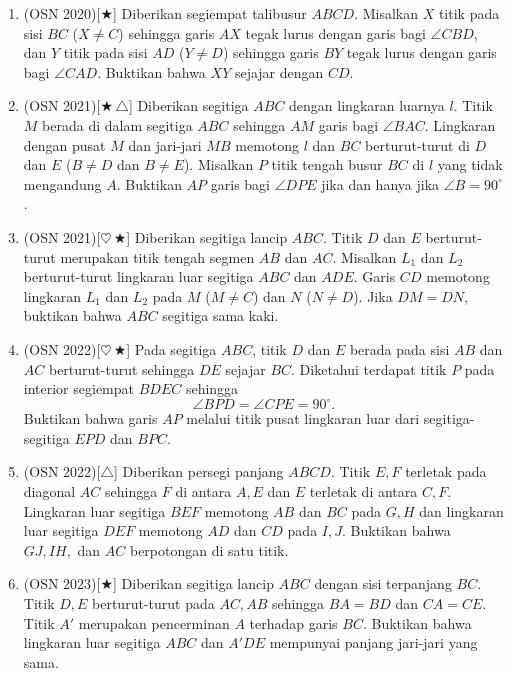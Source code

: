 \documentclass[letterpaper, 13pt]{scrartcl}
\begin{document}
\begin{enumerate}
  \item (OSN 2020)[$\bigstar$] Diberikan segiempat talibusur $ABCD$. Misalkan $X$ titik pada sisi $BC$ ($X \neq C$) sehingga garis $AX$ tegak lurus dengan garis bagi $\angle CBD$, dan $Y$ titik pada sisi $AD$ ($Y \neq D$) sehingga garis $BY$ tegak lurus dengan garis bagi $\angle CAD$. Buktikan bahwa $XY$ sejajar dengan $CD$.

  \item (OSN 2021)[$\bigstar\,\triangle$] Diberikan segitiga $ABC$ dengan lingkaran luarnya $l$. Titik $M$ berada di dalam segitiga $ABC$ sehingga $AM$ garis bagi $\angle BAC$. Lingkaran dengan pusat $M$ dan jari-jari $MB$ memotong $l$ dan $BC$ berturut-turut di $D$ dan $E$ ($B \neq D$ dan $B \neq E$). Misalkan $P$ titik tengah busur $BC$ di $l$ yang tidak mengandung $A$. Buktikan $AP$ garis bagi $\angle DPE$ jika dan hanya jika $\angle B = 90^\circ$.

  \item (OSN 2021)[$\heartsuit\,\bigstar$] Diberikan segitiga lancip $ABC$. Titik $D$ dan $E$ berturut-turut merupakan titik tengah segmen $AB$ dan $AC$. Misalkan $L_1$ dan $L_2$ berturut-turut lingkaran luar segitiga $ABC$ dan $ADE$. Garis $CD$ memotong lingkaran $L_1$ dan $L_2$ pada $M$ ($M \neq C$) dan $N$ ($N \neq D$). Jika $DM = DN$, buktikan bahwa $ABC$ segitiga sama kaki.

  \item (OSN 2022)[$\heartsuit\,\bigstar$] Pada segitiga $ABC$, titik $D$ dan $E$ berada pada sisi $AB$ dan $AC$ berturut-turut sehingga $DE$ sejajar $BC$. Diketahui terdapat titik $P$ pada interior segiempat $BDEC$ sehingga
  $$\angle BPD = \angle CPE = 90^\circ.$$
  Buktikan bahwa garis $AP$ melalui titik pusat lingkaran luar dari segitiga-segitiga $EPD$ dan $BPC$.

  \item (OSN 2022)[$\triangle$] Diberikan persegi panjang $ABCD$. Titik $E, F$ terletak pada diagonal $AC$ sehingga $F$ di antara $A, E$ dan $E$ terletak di antara $C, F$. Lingkaran luar segitiga $BEF$ memotong $AB$ dan $BC$ pada $G, H$ dan lingkaran luar segitiga $DEF$ memotong $AD$ dan $CD$ pada $I, J$. Buktikan bahwa $GJ, IH,$ dan $AC$ berpotongan di satu titik.

  \item (OSN 2023)[$\bigstar$] Diberikan segitiga lancip $ABC$ dengan sisi terpanjang $BC$. Titik $D, E$ berturut-turut pada $AC, AB$ sehingga $BA = BD$ dan $CA = CE$. Titik $A'$ merupakan pencerminan $A$ terhadap garis $BC$. Buktikan bahwa lingkaran luar segitiga $ABC$ dan $A'DE$ mempunyai panjang jari-jari yang sama.


\end{enumerate}
\end{document}
